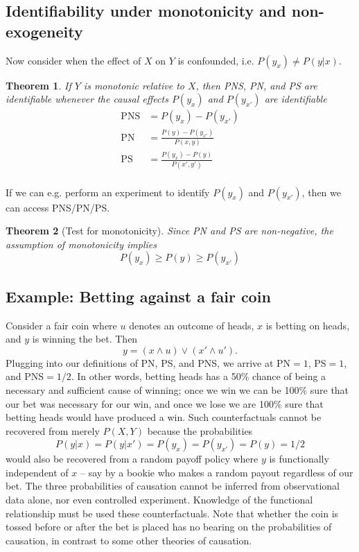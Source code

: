\documentclass[11pt]{article}
\numberwithin{equation}{section}
\newtheorem{thm}{Theorem}[section]
\begin{document}
\subsection{Identifiability under monotonicity and non-exogeneity}
Now consider when the effect of $X$ on $Y$ is confounded, i.e. $P(y_x)\neq P(y|x)$. 
\begin{thm}
If $Y$ is monotonic relative to $X$, then PNS, PN, and PS are identifiable whenever the causal effects $P(y_x)$ and $P(y_{x'})$ are identifiable
\begin{align}
\text{PNS} &= P(y_x)-P(y_{x'}) \\
\text{PN} &= \frac{P(y)-P(y_{x'})}{P(x,y)} \\
\text{PS} &= \frac{P(y_x)-P(y)}{P(x',y')} \\
\end{align}
\end{thm}
If we can e.g. perform an experiment to identify $P(y_x)$ and $P(y_{x'})$, then we can access PNS/PN/PS.

\begin{thm}[Test for monotonicity]
Since PN and PS are non-negative, the assumption of monotonicity implies
\begin{equation}
P(y_x) \geq P(y) \geq P(y_{x'})
\end{equation}
\end{thm}

\subsection{Example: Betting against a fair coin}
Consider a fair coin where $u$ denotes an outcome of heads, $x$ is betting on heads, and $y$ is winning the bet. Then
\begin{equation}
y=(x \wedge u) \vee (x' \wedge u').
\end{equation}
Plugging into our definitions of PN, PS, and PNS, we arrive at PN$=1$, PS$=1$, and PNS$=1/2$. In other words, betting heads has a 50\% chance of being a necessary and sufficient cause of winning; once we win we can be 100\% sure that our bet was necessary for our win, and once we lose we are 100\% sure that betting heads would have produced a win. Such counterfactuals cannot be recovered from merely $P(X,Y)$ because the probabilities
\begin{equation}
P(y|x) = P(y|x') = P(y_x) = P(y_{x'}) = P(y) = 1/2
\end{equation}
would also be recovered from a random payoff policy where $y$ is functionally independent of $x$ -- say by a bookie who makes a random payout regardless of our bet. The three probabilities of causation cannot be inferred from observational data alone, nor even controlled experiment. Knowledge of the functional relationship must be used these counterfactuals. Note that whether the coin is tossed before or after the bet is placed has no bearing on the probabilities of causation, in contrast to some other theories of causation.
\end{document}

